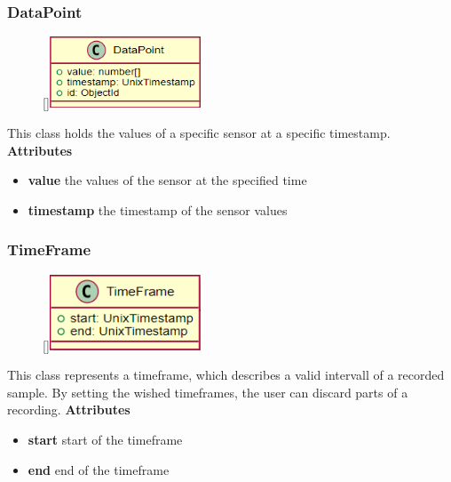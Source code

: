 \subsubsection{DataPoint}
\label{DataPoint}
\begin{figure}
    \raisebox{0pt}[\dimexpr{}\baselineskip\relax]{\includegraphics[width=4.5cm]{classes/workspace-management/9.png}}
\end{figure} 
\par
This class holds the values of a specific sensor at a specific timestamp.
\newline
\newline
\textbf{Attributes}
\begin{itemize}
    \item \textbf{value} the values of the sensor at the specified time
    \item \textbf{timestamp} the timestamp of the sensor values
\end{itemize}

\subsubsection{TimeFrame}
\label{TimeFrame}
\begin{figure}
    \raisebox{0pt}[\dimexpr{}\baselineskip\relax]{\includegraphics[width=4.5cm]{classes/workspace-management/10.png}}
\end{figure} 
\par
This class represents a timeframe, which describes a valid intervall of a recorded sample. By setting the wished timeframes, the user can discard parts of a recording.
\newline
\newline
\textbf{Attributes}
\begin{itemize}
    \item \textbf{start} start of the timeframe
    \item \textbf{end} end of the timeframe
\end{itemize}

